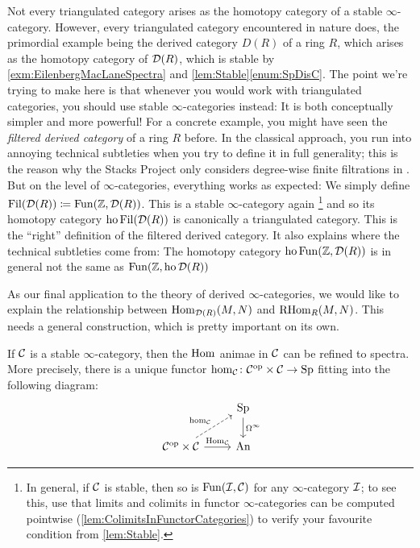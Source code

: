 \begin{numpar}
	Not every triangulated category arises as the homotopy category of a stable $\infty$-category. However, every triangulated category encountered in nature does, the primordial example being the derived category $D(R)$ of a ring $R$, which arises as the homotopy category of $\mathcal{D}(R)$, which is stable by \cref{exm:EilenbergMacLaneSpectra} and \cref{lem:Stable}\cref{enum:SpDisC}. The point we're trying to make here is that whenever you would work with triangulated categories, you should use stable $\infty$-categories instead: It is both conceptually simpler and more powerful! For a concrete example, you might have seen the \emph{filtered derived category} of a ring $R$ before. In the classical approach, you run into annoying technical subtleties when you try to define it in full generality; this is the reason why the Stacks Project only considers degree-wise finite filtrations in \cite[]{Stacks}. But on the level of $\infty$-categories, everything works as expected: We simply define $\operatorname{Fil}(\mathcal{D}(R))\coloneqq \operatorname{Fun}(\mathbb{Z},\mathcal{D}(R))$. This is a stable $\infty$-category again%
	\footnote{In general, if $\mathcal{C}$ is stable, then so is $\operatorname{Fun}(\mathcal{I},\mathcal{C})$ for any $\infty$-category $\mathcal{I}$; to see this, use that limits and colimits in functor $\infty$-categories can be computed pointwise (\cref{lem:ColimitsInFunctorCategories}) to verify your favourite condition from \cref{lem:Stable}.}
	and so its homotopy category $\operatorname{ho}\operatorname{Fil}(\mathcal{D}(R))$ is canonically a triangulated category. This is the \enquote{right} definition of the filtered derived category. It also explains where the technical subtleties come from: The homotopy category $\operatorname{ho}\operatorname{Fun}(\mathbb{Z},\mathcal{D}(R))$ is in general not the same as $\operatorname{Fun}(\mathbb{Z},\operatorname{ho}\mathcal{D}(R))$
\end{numpar}
As our final application to the theory of derived $\infty$-categories, we would like to explain the relationship between $\operatorname{Hom}_{\mathcal{D}(R)}(M,N)$ and $\operatorname{RHom}_R(M,N)$. This needs a general construction, which is pretty important on its own.
\begin{lem}\label{cor:hom}
	If $\mathcal{C}$ is a stable $\infty$-category, then the $\operatorname{Hom}$ animae in $\mathcal{C}$ can be refined to spectra. More precisely, there is a unique  functor $\hom_{\mathcal{C}}\colon \mathcal{C}^{\mathrm{op}}\times\mathcal{C}\rightarrow\mathrm{Sp}$ fitting into the following diagram:
	\begin{equation*}
		\begin{tikzcd}
			& \cat{Sp}\dar["\Omega^\infty"]\\
			\Cc^\op\times\Cc\urar[dashed,"\hom_\Cc"]\rar["\Hom_\Cc"] & \cat{An} 
		\end{tikzcd}
	\end{equation*}
\end{lem}
